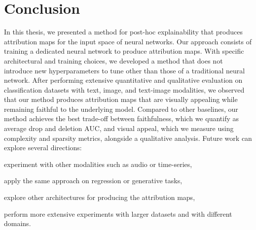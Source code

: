 \chapter{Conclusion} \label{ch:conclusion}

In this thesis, we presented a method for post-hoc explainability that produces attribution maps for the input space of neural networks. Our approach consists of training a dedicated neural network to produce attribution maps. With specific architectural and training choices, we developed a method that does not introduce new hyperparameters to tune other than those of a traditional neural network. After performing extensive quantitative and qualitative evaluation on classification datasets with text, image, and text-image modalities, we observed that our method produces attribution maps that are visually appealing while remaining faithful to the underlying model. Compared to other baselines, our method achieves the best trade-off between faithfulness, which we quantify as average drop and deletion AUC, and visual appeal, which we measure using complexity and sparsity metrics, alongside a qualitative analysis. Future work can explore several directions: 
\begin{enumerate*}
    \item experiment with other modalities such as audio or time-series,
    \item apply the same approach on regression or generative tasks,
    \item explore other architectures for producing the attribution maps,
    \item perform more extensive experiments with larger datasets and with different domains.
\end{enumerate*}